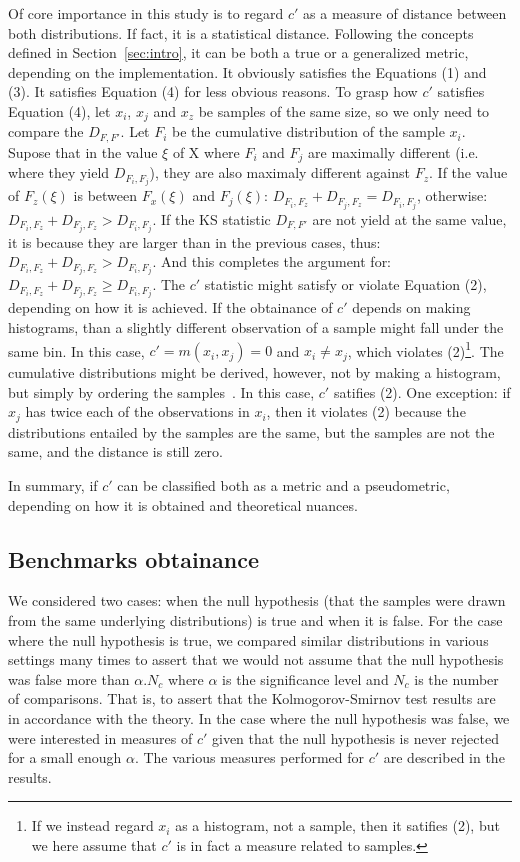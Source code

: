 \documentclass[12pt,fleqn]{article}
\begin{document}
Of core importance in this study is to regard $c'$
as a measure of distance between both distributions.
If fact, it is a statistical distance.
Following the concepts defined in Section~\ref{sec:intro},
it can be both a true or a generalized metric, depending on the implementation.
It obviously satisfies the Equations (1) and (3).
It satisfies Equation (4) for less obvious reasons.
To grasp how $c'$ satisfies Equation (4),
let $x_i$, $x_j$ and $x_z$ be samples of the same size,
so we only need to compare the $D_{F,F'}$.
Let $F_i$ be the cumulative distribution of the sample $x_i$.
Supose that in the value $\xi$ of X where $F_i$ and $F_j$ are maximally different (i.e. where they yield $D_{F_i,F_j}$),
they are also maximaly different against $F_z$.
If the value of $F_z(\xi)$ is between $F_x(\xi)$ and $F_j(\xi)$:
$D_{F_i,F_z}+D_{F_j,F_z} = D_{F_i,F_j}$,
otherwise:
$D_{F_i,F_z}+D_{F_j,F_z} > D_{F_i,F_j}$.
If the KS statistic $D_{F,F'}$ are not yield at the same value,
it is because they are larger than in the previous cases, thus:
$D_{F_i,F_z}+D_{F_j,F_z} > D_{F_i,F_j}$.
And this completes the argument for:
$D_{F_i,F_z}+D_{F_j,F_z} \geq D_{F_i,F_j}$.
The $c'$ statistic might satisfy or violate Equation (2),
depending on how it is achieved.
If the obtainance of $c'$ depends on making histograms,
than a slightly different observation of a sample might fall under the same bin.
In this case, $c'=m(x_i,x_j) = 0$ and $x_i \neq x_j$, which violates (2)\footnote{If
we instead regard $x_i$ as a histogram, not a sample,
then it satifies (2), but we here assume that $c'$
is in fact a measure related to samples.}.
The cumulative distributions might be derived, however,
not by making a histogram, but simply by ordering the samples~\citep{stack}.
In this case, $c'$ satifies (2).
One exception: if $x_j$ has twice each of the observations in $x_i$,
then it violates (2)
because the distributions entailed by the samples are the same,
but the samples are not the same, and the distance is still zero.

In summary, if $c'$ can be classified both as a metric and a pseudometric,
depending on how it is obtained and theoretical nuances.

\subsection{Benchmarks obtainance}
We considered two cases: when the null hypothesis (that the samples were drawn from the same underlying distributions)
is true and when it is false.
For the case where the null hypothesis is true, 
we compared similar distributions in various settings
many times to assert that we would not assume
that the null hypothesis was false more than
$\alpha . N_c$ where $\alpha$ is the significance level
and $N_c$ is the number of comparisons.
That is, to assert that the Kolmogorov-Smirnov test results
are in accordance with the theory.
In the case where the null hypothesis was false, 
we were interested in measures of $c'$ given that
the null hypothesis is never rejected for a small enough
$\alpha$.
The various measures performed for $c'$ are
described in the results.
\end{document}
